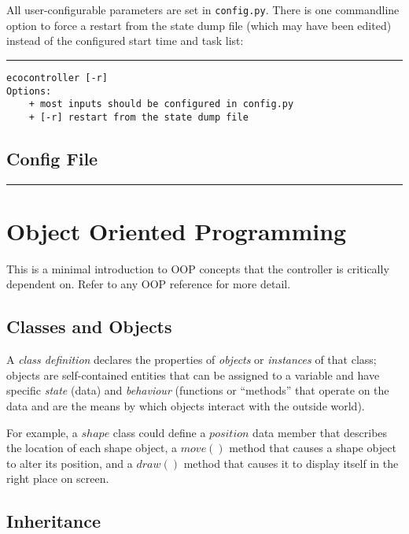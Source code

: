 \documentclass[11pt,a4paper]{report}
\begin{document}
All user-configurable parameters are set in \verb#config.py#. There is
one commandline option to force a restart from the state dump file
(which may have been edited) instead of the configured start time and
task list:

\lstset{language=sh}

\noindent
\rule{5cm}{.2mm}
\begin{lstlisting}
ecocontroller [-r]
Options:
    + most inputs should be configured in config.py
    + [-r] restart from the state dump file
\end{lstlisting}

\lstset{language=Python}

\section{Config File}

\noindent
\rule{5cm}{.2mm}


\appendix

\chapter{Object Oriented Programming}

This is a minimal introduction to OOP concepts that the controller is
critically dependent on. Refer to any OOP reference for more detail.

\section{Classes and Objects}

A {\em class definition} declares the properties of {\em objects} or
{\em instances} of that class; objects are self-contained entities that
can be assigned to a variable and have specific {\em state} (data) and
{\em behaviour} (functions or ``methods'' that operate on the data and
are the means by which objects interact with the outside world).    

For example, a $shape$ class could define a $position$ data member that
describes the location of each shape object, a $move()$ method that
causes a shape object to alter its position, and a $draw()$ method that
causes it to display itself in the right place on screen.

\section{Inheritance}
\end{document}
